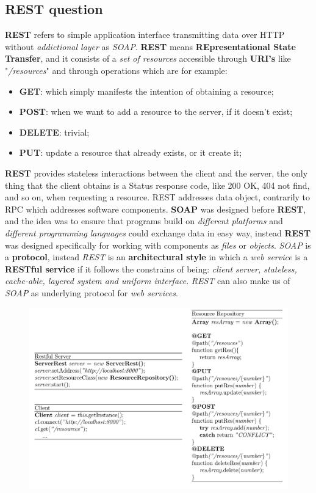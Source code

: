 \documentclass{article}
\begin{document}
\subsection{REST question}
\textbf{REST} refers to simple application interface transmitting data over HTTP without \emph{addictional layer} as \emph{SOAP}. \textbf{REST} means \textbf{REpresentational State Transfer}, and it consists of a \emph{set of resources} accessible through \textbf{URI's} like "\emph{/resources}" and through operations which are for example:
\begin{itemize}
\item \textbf{GET}: which simply manifests the intention of obtaining a resource;
\item \textbf{POST}: when we want to add a resource to the server, if it doesn't exist;
\item \textbf{DELETE}: trivial;
\item \textbf{PUT}: update a resource that already exists, or it create it;
\end{itemize}
\textbf{REST} provides stateless interactions between the client and the server, the only thing that the client obtains is a Status response code, like 200 OK, 404 not find, and so on, when requesting a resource. REST addresses data object, contrarily to RPC which addresses software components. \textbf{SOAP} was designed before \textbf{REST}, and the idea was to ensure that programs build on \emph{different platforms} and \emph{different programming languages} could exchange data in easy way, instead \textbf{REST} was designed specifically for working with components as \emph{files} or \emph{objects}. \emph{SOAP} is a \textbf{protocol}, instead \emph{REST} is an \textbf{architectural style} in which a \emph{web service} is a \textbf{RESTful service} if it follows the constrains of being: \emph{client server, stateless, cache-able, layered system and uniform interface}. \emph{REST} can also make us of \emph{SOAP} as underlying protocol for \emph{web services}.

\begin{figure}[H]
  \centering
  \includegraphics[scale=1]{cattura13.png}
\end{figure}
\end{document}
